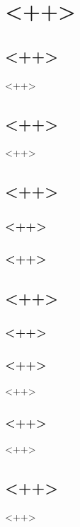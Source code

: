 \documentclass[chapter=TITLE,oneside]{abntex2} %
\begin{document}
\chapter{<++>}\label{sec:<++>}

\section{<++>}\label{sec:<++>}

<++>

\section{<++>}\label{sec:<++>}

<++>

\section{<++>}\label{sec:<++>}

    \subsection{<++>}\label{sec:<++>}
        \begin{alineas}
            \item <++>
            \item <++>
            \item <++>
        \end{alineas}

    \subsection{<++>}\label{sec:<++>}
        \begin{alineas}[resume]
            \item <++>
        \end{alineas}

\section{<++>}\label{sec:<++>}

    \subsection{<++>}\label{sec:<++>}


    \subsection{<++>}\label{sec:<++>}

    <++>

    \subsection{<++>}\label{sec:<++>}

    <++>

\section{<++>}\label{sec:<++>}

<++>

\printbibliography
\end{document}
